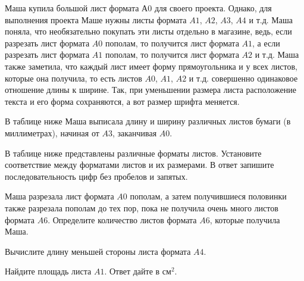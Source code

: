\begin{homework}[number=1]
	\begin{listofex}
		\item[] Маша купила большой лист формата А0 для своего проекта. Однако, для выполнения проекта Маше нужны листы формата \( A1 \), \( A2 \), \( A3 \), \( A4 \) и т.д. Маша поняла, что необязательно покупать эти листы отдельно в магазине, ведь, если разрезать лист формата \( A0  \) пополам, то получится лист формата \( A1 \), а если разрезать лист формата \( A1 \) пополам, то получится лист формата \( A2 \) и т.д. Маша также заметила, что каждый лист имеет форму прямоугольника и у всех листов, которые она получила, то есть листов \( A0 \), \( A1 \), \( A2 \) и т.д. совершенно одинаковое отношение длины к ширине. 
		Так, при уменьшении размера листа расположение текста и его форма сохраняются, а вот размер шрифта меняется.
		\begin{figure}[h]
		\end{figure}
		\item[] В таблице ниже Маша выписала длину и ширину различных листов бумаги (в миллиметрах),
		начиная от \( A3 \), заканчивая \( A0 \).
		\begin{figure}[h]
		\end{figure}
		\item В таблице ниже представлены различные форматы листов. Установите соответствие между форматами листов и их размерами. В ответ запишите последовательность цифр без пробелов и запятых.
		\begin{figure}[h]
		\end{figure}
		\item Маша разрезала лист формата \( A0 \) пополам, а затем получившиеся половинки также разрезала пополам до тех пор, пока не получила очень много листов формата \( A6 \). Определите количество листов формата \( A6 \), которые получила Маша.
		\item Вычислите длину меньшей стороны листа формата \( A4 \).
		\item Найдите площадь листа \( A1 \). Ответ дайте в см\( ^{2} \).

\end{listofex}
\end{homework}
